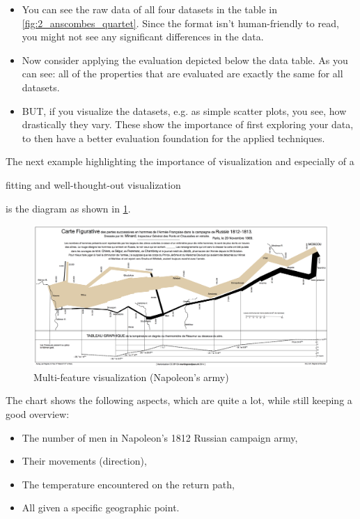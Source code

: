 \begin{note}
\begin{itemize}
  \item You can see the raw data of all four datasets in the table in \ref{fig:2_anscombes_quartet}. Since the format isn't human-friendly to read, you might not see any significant differences in the data.
  \item Now consider applying the evaluation depicted below the data table. As you can see: all of the properties that are evaluated are exactly the same for all datasets.
  \item BUT, if you visualize the datasets, e.g. as simple scatter plots, you see, how drastically they vary. These show the importance of first exploring your data, to then have a better evaluation foundation for the applied techniques.
\end{itemize} 
\end{note}

\begin{note}The next example highlighting the importance of visualization and especially of a \end{note}fitting and well-thought-out visualization\begin{note} is the diagram as shown in \ref{fig:2_napoleon}. 

\begin{figure}[H]
  \centering
  \includegraphics[width=\textwidth]{assets/visualization_and_extraction/napolean.png}
  \caption{Multi-feature visualization (Napoleon's army)}
  \label{fig:2_napoleon}
\end{figure}

The chart shows the following aspects, which are quite a lot, while still keeping a good overview:
\begin{itemize}
  \item The number of men in Napoleon's 1812 Russian campaign army,
  \item Their movements (direction),
  \item The temperature encountered on the return path,
  \item All given a specific geographic point.
\end{itemize}
\end{note}

